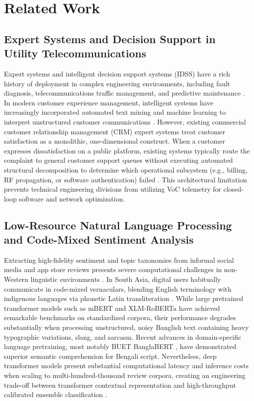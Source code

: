 \documentclass[5p,twocolumn,authoryear]{elsarticle}
\begin{document}
\section{Related Work}
\label{sec:related_work}

\subsection{Expert Systems and Decision Support in Utility Telecommunications}
Expert systems and intelligent decision support systems (IDSS) have a rich history of deployment in complex engineering environments, including fault diagnosis, telecommunications traffic management, and predictive maintenance \citep{liao2005expert}. In modern customer experience management, intelligent systems have increasingly incorporated automated text mining and machine learning to interpret unstructured customer communications \citep{cambria2017senticnet, zhang2018deep}. However, existing commercial customer relationship management (CRM) expert systems treat customer satisfaction as a monolithic, one-dimensional construct. When a customer expresses dissatisfaction on a public platform, existing systems typically route the complaint to general customer support queues without executing automated structural decomposition to determine which operational subsystem (e.g., billing, RF propagation, or software authentication) failed \citep{parasuraman2005esqual, meuter2000self}. This architectural limitation prevents technical engineering divisions from utilizing VoC telemetry for closed-loop software and network optimization.

\subsection{Low-Resource Natural Language Processing and Code-Mixed Sentiment Analysis}
Extracting high-fidelity sentiment and topic taxonomies from informal social media and app store reviews presents severe computational challenges in non-Western linguistic environments \citep{pang2008opinion}. In South Asia, digital users habitually communicate in code-mixed vernaculars, blending English terminology with indigenous languages via phonetic Latin transliteration \citep{rahman2021deep, sazzed2021cross}. While large pretrained transformer models such as mBERT and XLM-RoBERTa \citep{devlin2019bert} have achieved remarkable benchmarks on standardized corpora, their performance degrades substantially when processing unstructured, noisy Banglish text containing heavy typographic variations, slang, and sarcasm. Recent advances in domain-specific language pretraining, most notably BUET BanglaBERT \citep{bhattacharjee2022banglabert}, have demonstrated superior semantic comprehension for Bengali script. Nevertheless, deep transformer models present substantial computational latency and inference costs when scaling to multi-hundred-thousand review corpora, creating an engineering trade-off between transformer contextual representation and high-throughput calibrated ensemble classification \citep{kuncheva2004combining}.
\end{document}
